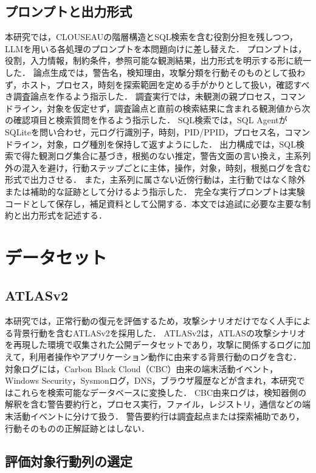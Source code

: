 \documentclass[a4paper,twocolumn,10pt]{article}
\newcommand{\code}[1]{{\small\ttfamily #1}}
\begin{document}
\subsection{プロンプトと出力形式}

本研究では，CLOUSEAUの階層構造とSQL検索を含む役割分担を残しつつ，LLMを用いる各処理のプロンプトを本問題向けに差し替えた．
プロンプトは，役割，入力情報，制約条件，参照可能な観測結果，出力形式を明示する形に統一した．
論点生成では，警告名，検知理由，攻撃分類を行動そのものとして扱わず，ホスト，プロセス，時刻を探索範囲を定める手がかりとして扱い，確認すべき調査論点を作るよう指示した．
調査実行では，未観測の親プロセス，コマンドライン，対象を仮定せず，調査論点と直前の検索結果に含まれる観測値から次の確認項目と検索質問を作るよう指示した．
SQL検索では，SQL AgentがSQLiteを問い合わせ，元ログ行識別子，時刻，\code{PID/PPID}，プロセス名，コマンドライン，対象，ログ種別を保持して返すようにした．
出力構成では，SQL検索で得た観測ログ集合に基づき，根拠のない推定，警告文面の言い換え，主系列外の混入を避け，行動ステップごとに主体，操作，対象，時刻，根拠ログを含む形式で出力させる．
また，主系列に属さない近傍行動は，主行動ではなく除外または補助的な証跡として分けるよう指示した．
完全な実行プロンプトは実験コードとして保存し，補足資料として公開する．本文では追試に必要な主要な制約と出力形式を記述する．

\section{データセット}
\label{sec:dataset}

\subsection{ATLASv2}

本研究では，正常行動の復元を評価するため，攻撃シナリオだけでなく人手による背景行動を含むATLASv2\cite{atlasv2}を採用した．
ATLASv2は，ATLASの攻撃シナリオを再現した環境で収集された公開データセットであり，攻撃に関係するログに加えて，利用者操作やアプリケーション動作に由来する背景行動のログを含む．
対象ログには，Carbon Black Cloud（CBC）由来の端末活動イベント，Windows Security，Sysmonログ\cite{sysmon}，DNS，ブラウザ履歴などが含まれ，本研究ではこれらを検索可能なデータベースに変換した．
CBC由来ログは，検知器側の解釈を含む警告要約行と，プロセス実行，ファイル，レジストリ，通信などの端末活動イベントに分けて扱う．
警告要約行は調査起点または探索補助であり，行動そのものの正解証跡とはしない．

\subsection{評価対象行動列の選定}
\end{document}
